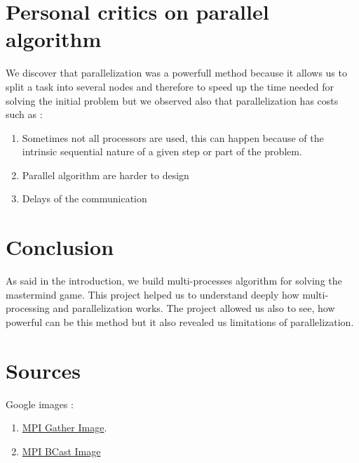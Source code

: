 \section{Personal critics on parallel algorithm}
We discover that parallelization was a powerfull method because it allows us to split a task into several nodes and therefore to speed up the time needed for solving the initial problem but we observed also that parallelization has costs such as :
\begin{enumerate}
    \item Sometimes not all processors are used, this can happen because of the intrinsic sequential nature of a given step or part of the problem.
    \item Parallel algorithm are harder to design 
    \item Delays of the communication 
\end{enumerate}

\section{Conclusion}
As said in the introduction, we build multi-processes algorithm for solving the mastermind game. This project helped us to understand deeply how multi-processing and parallelization works. The project allowed us also to see, how powerful can be this method but it also revealed us limitations of parallelization.

\section{Sources}
Google images : 
\begin{enumerate}
    \item  \href{https://www.google.com/search?q=mpi+gather&source=lnms&tbm=isch&sa=X&ved=0ahUKEwiux-DMh5$_$fAhVQbFAKHX87DsUQ$_$AUIDigB&biw=1366&bih=695#imgrc=wk5b6Rw6eXn95M:}{MPI Gather Image}.
    
    \item \href{https://www.google.com/search?q=mpi+gather&source=lnms&tbm=isch&sa=X&ved=0ahUKEwiux
-DMh5_fAhVQbFAKHX87DsUQ_AUIDigB&biw=1366&bih=695#imgrc=WAJ80qLx2p9dvM:}{MPI BCast Image}
\end{enumerate}

